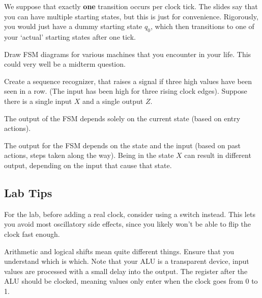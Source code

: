 We suppose that exactly \textbf{one} transition occurs per clock tick. The slides say that you can have multiple starting states, but this is just for convenience. Rigorously, you would just have a dummy starting state $q_0$, which then transitions to one of your `actual' starting states after one tick.

\begin{exercise}
Draw FSM diagrams for various machines that you encounter in your life. This could very well be a midterm question.
\end{exercise}

\begin{exercise}
    Create a sequence recognizer, that raises a signal if three high values have been seen in a row. (The input has been high for three rising clock edges). Suppose there is a single input $X$ and a single output $Z$. 
\end{exercise}

\begin{definition}
    The output of the FSM depends solely on the current state (based on entry actions).
\end{definition}

\begin{definition}
    The output for the FSM depends on the state and the input (based on past actions, steps taken along the way). Being in the state $X$ can result in different output, depending on the input that cause that state. 
\end{definition}

\subsection{Lab Tips}

For the lab, before adding a real clock, consider using a switch instead. This lets you avoid most oscillatory side effects, since you likely won't be able to flip the clock fast enough.

Arithmetic and logical shifts mean quite different things. Ensure that you understand which is which. Note that your ALU is a transparent device, input values are processed with a small delay into the output. The register after the ALU should be clocked, meaning values only enter when the clock goes from 0 to 1.
